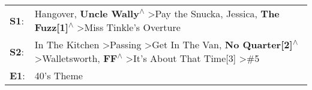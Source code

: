 \begin{supertabular}{p{0.03\textwidth}p{0.92\textwidth}}
 \textbf{S1}:  &                                                                                                               Hangover\textsuperscript{}, \enspace \textbf{Uncle Wally\textsuperscript{$\wedge$}} \textgreater \enspace Pay the Snucka\textsuperscript{}, \enspace Jessica\textsuperscript{}, \enspace \textbf{The Fuzz[1]\textsuperscript{$\wedge$}} \textgreater \enspace Miss Tinkle's Overture\textsuperscript{}  \enspace  \\
 \textbf{S2}:  &  In The Kitchen\textsuperscript{} \textgreater \enspace Passing\textsuperscript{} \textgreater \enspace Get In The Van\textsuperscript{}, \enspace \textbf{No Quarter[2]\textsuperscript{$\wedge$}} \textgreater \enspace Walletsworth\textsuperscript{}, \enspace \textbf{FF\textsuperscript{$\wedge$}} \textgreater \enspace It's About That Time[3]\textsuperscript{} \textgreater \enspace \#5\textsuperscript{}  \enspace  \\
 \textbf{E1}:  &                                                                                                                                                                                                                                                                                                                                                                                         40's Theme\textsuperscript{}  \enspace  \\
\end{supertabular}
